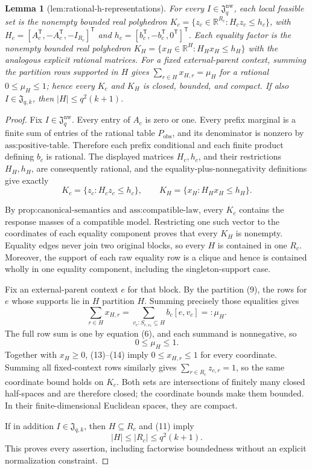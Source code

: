 \documentclass{article}
\newtheorem{lemma}{Lemma}
\begin{document}
\begin{lemma}[lem:rational-h-representations]\label{lem:rational-h-representations}
For every \(I\in\mathfrak J_q^{\mathrm{nw}}\), each local feasible set is the nonempty bounded real polyhedron \(K_c=\{z_c\in\mathbb R^{R_c}:H_cz_c\le h_c\}\), with \(H_c=[A_c^{\mathsf T},-A_c^{\mathsf T},-I_{R_c}]^{\mathsf T}\) and \(h_c=[b_c^{\mathsf T},-b_c^{\mathsf T},0^{\mathsf T}]^{\mathsf T}\). Each equality factor is the nonempty bounded real polyhedron \(K_H=\{x_H\in\mathbb R^H:H_Hx_H\le h_H\}\) with the analogous explicit rational matrices. For a fixed external-parent context, summing the partition rows supported in \(H\) gives \(\sum_{r\in H}x_{H,r}=\mu_H\) for a rational \(0\le\mu_H\le1\); hence every \(K_c\) and \(K_H\) is closed, bounded, and compact. If also \(I\in\mathfrak J_{q,k}\), then \(|H|\le q^2(k+1)\).
\end{lemma}
\begin{proof}
Fix \(I\in\mathfrak J_q^{\mathrm{nw}}\).  Every entry of \(A_c\) is zero or one.  Every prefix marginal is a finite sum of entries of the rational table \(P_{\mathrm{obs}}\), and its denominator is nonzero by \(\text{ass:positive-table}\).  Therefore each prefix conditional and each finite product defining \(b_c\) is rational.  The displayed matrices \(H_c,h_c\), and their restrictions \(H_H,h_H\), are consequently rational, and the equality-plus-nonnegativity definitions give exactly
\[
K_c=\{z_c:H_cz_c\le h_c\},\qquad
K_H=\{x_H:H_Hx_H\le h_H\}. \tag{12}
\]

By \(\text{prop:canonical-semantics}\) and \(\text{ass:compatible-law}\), every \(K_c\) contains the response masses of a compatible model.  Restricting one such vector to the coordinates of each equality component proves that every \(K_H\) is nonempty.  Equality edges never join two original blocks, so every \(H\) is contained in one \(R_c\).  Moreover, the support of each raw equality row is a clique and hence is contained wholly in one equality component, including the singleton-support case.

Fix an external-parent context \(e\) for that block.  By the partition (9), the rows for \(e\) whose supports lie in \(H\) partition \(H\).  Summing precisely those equalities gives
\[
\sum_{r\in H}x_{H,r}
=\sum_{v_c:S_{e,v_c}\subseteq H}b_c[e,v_c]
=:\mu_H. \tag{13}
\]
The full row sum is one by equation (6), and each summand is nonnegative, so
\[
0\le\mu_H\le1. \tag{14}
\]
Together with \(x_H\ge0\), (13)--(14) imply \(0\le x_{H,r}\le1\) for every coordinate.  Summing all fixed-context rows similarly gives \(\sum_{r\in R_c}z_{c,r}=1\), so the same coordinate bound holds on \(K_c\).  Both sets are intersections of finitely many closed half-spaces and are therefore closed; the coordinate bounds make them bounded.  In their finite-dimensional Euclidean spaces, they are compact.

If in addition \(I\in\mathfrak J_{q,k}\), then \(H\subseteq R_c\) and (11) imply
\[
|H|\le |R_c|\le q^2(k+1). \tag{15}
\]
This proves every assertion, including factorwise boundedness without an explicit normalization constraint.
\end{proof}
\end{document}
